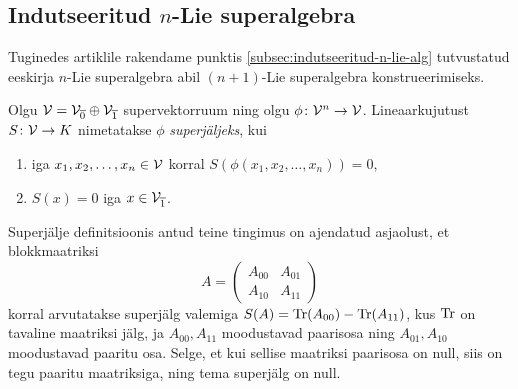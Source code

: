 \subsection{Indutseeritud \texorpdfstring{$n$}\ -Lie superalgebra}

Tuginedes artiklile \cite{Abramov:2014} rakendame punktis \ref{subsec:indutseeritud-n-lie-alg} tutvustatud eeskirja $n$-Lie superalgebra
abil $(n+1)$-Lie superalgebra konstrueerimiseks.

\begin{dfn}
    Olgu $\mathcal{V} = \mathcal{V}_{\overline{0}} \oplus \mathcal{V}_{\overline{1}}$
    supervektorruum ning olgu $\phi \colon \mathcal{V}^n \to \mathcal{V}$.
    Lineaarkujutust $S \colon \mathcal{V} \to K$ nimetatakse $\phi$
    \emph{superjäljeks}, kui
    \begin{enumerate}[label=\arabic*)]
        \item iga $x_1, x_2, \dots, x_n \in \mathcal{V}$ korral
            $S\left(\phi(x_1, x_2, \dots, x_n)\right) = 0$,
        \item $S(x) = 0$ iga $x \in \mathcal{V}_{\overline{1}}$.
    \end{enumerate}
\end{dfn}

\begin{markus}
    Superjälje definitsioonis antud teine tingimus on ajendatud
    asjaolust, et blokkmaatriksi
    \[
        A = \begin{pmatrix}
            A_{00} & A_{01} \\
            A_{10} & A_{11}
        \end{pmatrix}
    \]
    korral arvutatakse superjälg valemiga
    $S(A) = \operatorname{Tr}(A_{00}) - \operatorname{Tr}(A_{11})$, kus $\operatorname{Tr}$ on tavaline
    maatriksi jälg, ja $A_{00}, A_{11}$ moodustavad paarisosa
    ning $A_{01}, A_{10}$ moodustavad paaritu
    osa. Selge, et kui sellise maatriksi paarisosa on null, siis
    on tegu paaritu maatriksiga, ning tema superjälg on null.
\end{markus}

